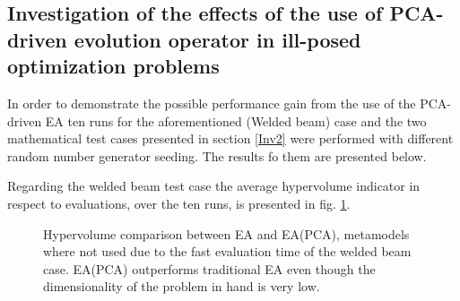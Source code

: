 
\subsection{Investigation of the effects of the use of PCA-driven evolution operator in ill-posed optimization problems}

In order to demonstrate the possible performance gain from the use of the PCA-driven EA ten runs for the aforementioned (Welded beam) case and the two mathematical test cases presented in section \ref{Inv2} were performed with different random number generator seeding. The results fo them are presented below. 

Regarding the welded beam test case the average hypervolume indicator in respect to evaluations, over the ten runs, is presented in fig. \ref{HypervolumeComparison}. 

\begin{figure}[h!]
\begin{minipage}[b]{1\linewidth}
 \centering
\end{minipage}
\caption{Hypervolume comparison between EA and EA(PCA), metamodels where not used due to the fast evaluation time of the welded beam case. EA(PCA) outperforms traditional EA even though the dimensionality of the problem in hand is very low.} 
\label{HypervolumeComparison}
\end{figure}

